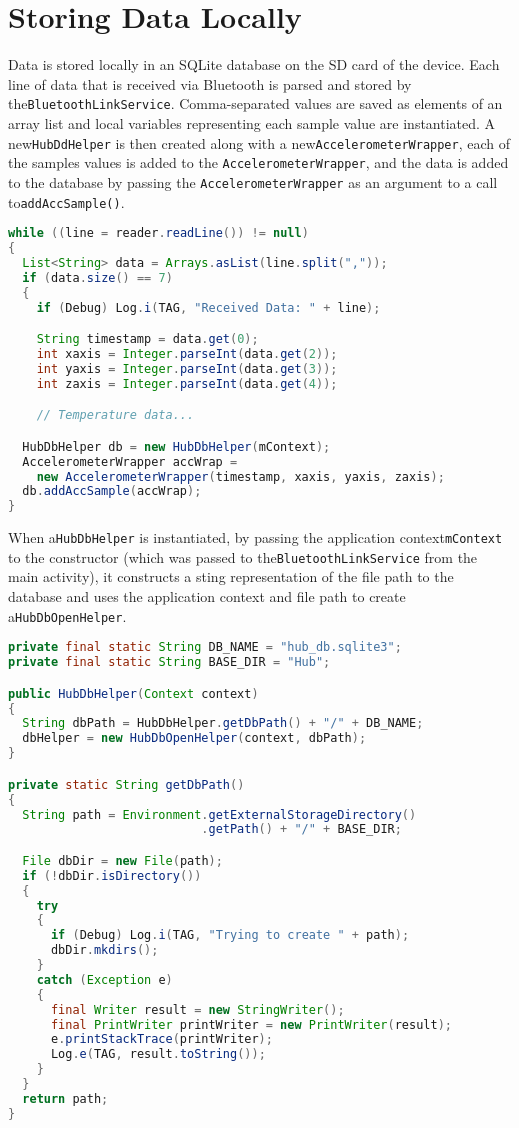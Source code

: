 \documentclass[11pt, a4paper, oneside, english]{scrbook}
\begin{document}
\section{Storing Data Locally} %
\label{sec:storing_data_locally}
Data is stored locally in an SQLite database on the SD card of the device. Each line of data that is received via Bluetooth is parsed and stored by the\lstinline{BluetoothLinkService}. Comma-separated values are saved as elements of an array list and local variables representing each sample value are instantiated. A new\lstinline{HubDdHelper} is then created along with a new\lstinline{AccelerometerWrapper}, each of the samples values is added to the \lstinline{AccelerometerWrapper}, and the data is added to the database by passing the \lstinline{AccelerometerWrapper} as an argument to a call to\lstinline{addAccSample()}.
\begin{lstlisting}[language=Java,
                   numbers=none]
while ((line = reader.readLine()) != null)
{
  List<String> data = Arrays.asList(line.split(","));
  if (data.size() == 7)
  {
    if (Debug) Log.i(TAG, "Received Data: " + line);  

    String timestamp = data.get(0);
    int xaxis = Integer.parseInt(data.get(2));
    int yaxis = Integer.parseInt(data.get(3));
    int zaxis = Integer.parseInt(data.get(4));

    // Temperature data...

  HubDbHelper db = new HubDbHelper(mContext);
  AccelerometerWrapper accWrap = 
    new AccelerometerWrapper(timestamp, xaxis, yaxis, zaxis);
  db.addAccSample(accWrap);
}
\end{lstlisting}
When a\lstinline{HubDbHelper} is instantiated, by passing the application context\lstinline{mContext} to the constructor (which was passed to the\lstinline{BluetoothLinkService} from the main activity), it constructs a sting representation of the file path to the database and uses the application context and file path to create a\lstinline{HubDbOpenHelper}.
\begin{lstlisting}[language=Java, numbers=none]
private final static String DB_NAME = "hub_db.sqlite3";
private final static String BASE_DIR = "Hub";

public HubDbHelper(Context context)
{
  String dbPath = HubDbHelper.getDbPath() + "/" + DB_NAME;
  dbHelper = new HubDbOpenHelper(context, dbPath);
}

private static String getDbPath()
{
  String path = Environment.getExternalStorageDirectory()
                           .getPath() + "/" + BASE_DIR;

  File dbDir = new File(path);
  if (!dbDir.isDirectory())
  {
    try
    {
      if (Debug) Log.i(TAG, "Trying to create " + path);
      dbDir.mkdirs();
    }
    catch (Exception e)
    {
      final Writer result = new StringWriter();
      final PrintWriter printWriter = new PrintWriter(result);
      e.printStackTrace(printWriter);
      Log.e(TAG, result.toString());
    }
  }
  return path;
}
\end{lstlisting}
\end{document}
